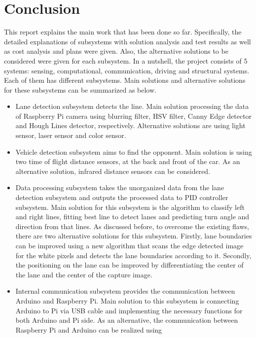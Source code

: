 \documentclass[a4paper,12pt]{article}
\begin{document}
	\section{Conclusion}
	This report explains the main work that has been done so far.  Specifically, the detailed explanations of subsystems with solution analysis and test results as well as cost analysis and plans were given. Also, the alternative solutions to be considered were given for each subsystem. In a nutshell, the project consists of 5 systems: sensing, computational, communication, driving and structural systems. Each of them has different subsystems. Main solutions and alternative solutions for these subsystems can be summarized as below.
	\begin{itemize}
		
		
		
		\item 	Lane detection subsystem detects the line. Main solution processing the data of Raspberry Pi camera using blurring filter, HSV filter, Canny Edge detector and Hough Lines detector, respectively. Alternative solutions are using light sensor, laser sensor and color sensor.
		\item 	Vehicle detection subsystem aims to find the opponent. Main solution is using two time of flight distance sensors, at the back and front of the car. As an alternative solution, infrared distance sensors can be considered.
		\item 	Data processing subsystem takes the unorganized data from the lane detection subsystem and outputs the processed data to PID controller subsystem. Main solution for this subsystem is the algorithm to classify left and right lines, fitting best line to detect lanes and predicting turn angle and direction from that lines. As discussed before, to overcome the existing flaws, there are two alternative solutions for this subsystem. Firstly, lane boundaries can be improved using a new algorithm that scans the edge detected image for the white pixels and detects the lane boundaries according to it. Secondly, the positioning on the lane can be improved by differentiating the center of the lane and the center of the capture image.
		\item 	Internal communication subsystem provides the communication between Arduino and Raspberry Pi. Main solution to this subsystem is connecting Arduino to Pi via USB cable and implementing the necessary functions for both Arduino and Pi side. As an alternative, the communication between Raspberry Pi and Arduino can be realized using

\end{itemize}
\end{document}
